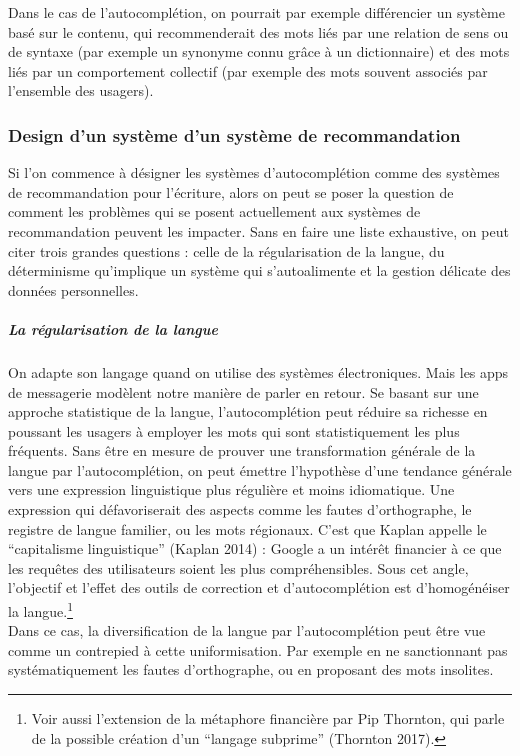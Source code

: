 \documentclass[]{article}
\let\oldsubparagraph\subparagraph
\renewcommand{\subparagraph}[1]{\oldsubparagraph{#1}\mbox{}}
\begin{document}
Dans le cas de l'autocomplétion, on pourrait par exemple différencier un
système basé sur le contenu, qui recommenderait des mots liés par une
relation de sens ou de syntaxe (par exemple un synonyme connu grâce à un
dictionnaire) et des mots liés par un comportement collectif (par
exemple des mots souvent associés par l'ensemble des usagers).

\hypertarget{design-dun-systuxe8me-dun-systuxe8me-de-recommandation}{%
\subsubsection{Design d'un système d'un système de
recommandation}\label{design-dun-systuxe8me-dun-systuxe8me-de-recommandation}}

Si l'on commence à désigner les systèmes d'autocomplétion comme des
systèmes de recommandation pour l'écriture, alors on peut se poser la
question de comment les problèmes qui se posent actuellement aux
systèmes de recommandation peuvent les impacter. Sans en faire une liste
exhaustive, on peut citer trois grandes questions : celle de la
régularisation de la langue, du déterminisme qu'implique un système qui
s'autoalimente et la gestion délicate des données personnelles.

\hypertarget{la-ruxe9gularisation-de-la-langue}{%
\subparagraph{La régularisation de la
langue}\label{la-ruxe9gularisation-de-la-langue}}

On adapte son langage quand on utilise des systèmes électroniques. Mais
les apps de messagerie modèlent notre manière de parler en retour. Se
basant sur une approche statistique de la langue, l'autocomplétion peut
réduire sa richesse en poussant les usagers à employer les mots qui sont
statistiquement les plus fréquents. Sans être en mesure de prouver une
transformation générale de la langue par l'autocomplétion, on peut
émettre l'hypothèse d'une tendance générale vers une expression
linguistique plus régulière et moins idiomatique. Une expression qui
défavoriserait des aspects comme les fautes d'orthographe, le registre
de langue familier, ou les mots régionaux. C'est que Kaplan appelle le
``capitalisme linguistique'' (Kaplan 2014) : Google a un intérêt
financier à ce que les requêtes des utilisateurs soient les plus
compréhensibles. Sous cet angle, l'objectif et l'effet des outils de
correction et d'autocomplétion est d'homogénéiser la langue.\footnote{Voir
  aussi l'extension de la métaphore financière par Pip Thornton, qui
  parle de la possible création d'un ``langage subprime'' (Thornton
  2017).}\\
Dans ce cas, la diversification de la langue par l'autocomplétion peut
être vue comme un contrepied à cette uniformisation. Par exemple en ne
sanctionnant pas systématiquement les fautes d'orthographe, ou en
proposant des mots insolites.
\end{document}
